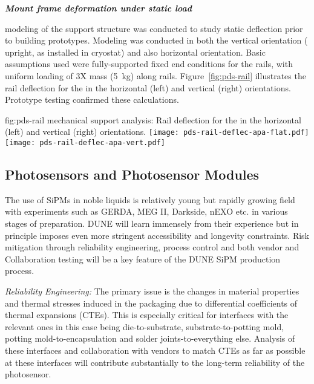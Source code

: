 \textit{\bf {} Mount frame deformation under static  load}


 modeling of the  support structure was conducted to study static deflection 
prior to building prototypes.  Modeling was conducted in both the vertical
 orientation ( upright, as installed in cryostat) and also horizontal orientation.  
Basic assumptions used were fully-supported fixed end conditions for the rails, 
with uniform loading of 3X  mass (\SI{5}{kg}) along rails.  
Figure~\ref{fig:pds-rail} illustrates the rail deflection for the  in the horizontal (left) and vertical (right) orientations.
Prototype testing confirmed these calculations.

\begin{dunefigure}{fig:pds-rail}
{ mechanical support analysis: Rail deflection for the  in the horizontal (left) and vertical (right) orientations.}
	\texttt{[image: pds-rail-deflec-apa-flat.pdf]} 
	\texttt{[image: pds-rail-deflec-apa-vert.pdf]}\\
\end{dunefigure}


\subsection{Photosensors and Photosensor Modules}
\label{sec:fdsp-pd-assy-psm}

The use of SiPMs in noble liquids is relatively young but rapidly growing field with experiments such as GERDA, MEG II, Darkside, nEXO etc. in various stages of preparation. DUNE will learn immensely from their experience but in principle imposes even more stringent accessibility and longevity constraints. Risk mitigation through reliability engineering, process control and both vendor and Collaboration testing will be a key feature of the DUNE SiPM production process.

{\it{Reliability Engineering:}} The primary issue is the changes in material properties and thermal stresses induced in the packaging due to differential coefficients of thermal expansions (CTEs). This is especially critical for interfaces with the relevant ones in this case being die-to-substrate, substrate-to-potting mold, potting mold-to-encapsulation and solder joints-to-everything else. Analysis of these interfaces and collaboration with vendors to match CTEs as far as possible at these interfaces will contribute substantially to the long-term reliability of the photosensor.

